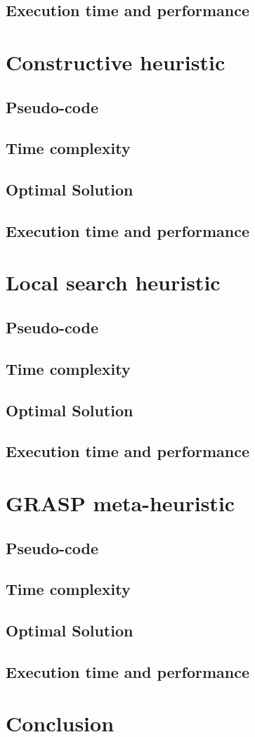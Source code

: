 \documentclass[a4paper, 12pt]{report}
\begin{document}
		\section{Execution time and performance}
	
	\chapter{Constructive heuristic}
		\section{Pseudo-code}
		\section{Time complexity}
		\section{Optimal Solution}
		\section{Execution time and performance}
	
	\chapter{Local search heuristic}
		\section{Pseudo-code}
		\section{Time complexity}
		\section{Optimal Solution}
		\section{Execution time and performance}
	
	\chapter{GRASP meta-heuristic}
		\section{Pseudo-code}
		\section{Time complexity}
		\section{Optimal Solution}
		\section{Execution time and performance}
	
	\chapter{Conclusion}
	
	
	
	
\end{document}
